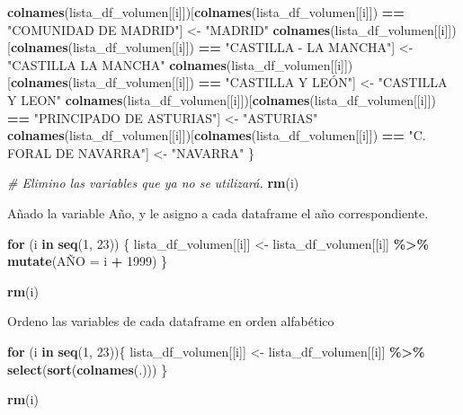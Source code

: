 \documentclass[
]{article}
\newenvironment{Shaded}{\begin{snugshade}}{\end{snugshade}}
\newcommand{\CommentTok}[1]{\textcolor[rgb]{0.56,0.35,0.01}{\textit{#1}}}
\newcommand{\ControlFlowTok}[1]{\textcolor[rgb]{0.13,0.29,0.53}{\textbf{#1}}}
\newcommand{\DecValTok}[1]{\textcolor[rgb]{0.00,0.00,0.81}{#1}}
\newcommand{\FunctionTok}[1]{\textcolor[rgb]{0.13,0.29,0.53}{\textbf{#1}}}
\newcommand{\NormalTok}[1]{#1}
\newcommand{\OtherTok}[1]{\textcolor[rgb]{0.56,0.35,0.01}{#1}}
\newcommand{\SpecialCharTok}[1]{\textcolor[rgb]{0.81,0.36,0.00}{\textbf{#1}}}
\newcommand{\StringTok}[1]{\textcolor[rgb]{0.31,0.60,0.02}{#1}}
\begin{document}
\begin{Shaded}
\begin{Highlighting}[]
  \FunctionTok{colnames}\NormalTok{(lista\_df\_volumen[[i]])[}\FunctionTok{colnames}\NormalTok{(lista\_df\_volumen[[i]]) }\SpecialCharTok{==} \StringTok{"COMUNIDAD DE MADRID"}\NormalTok{] }\OtherTok{\textless{}{-}} \StringTok{"MADRID"}
  \FunctionTok{colnames}\NormalTok{(lista\_df\_volumen[[i]])[}\FunctionTok{colnames}\NormalTok{(lista\_df\_volumen[[i]]) }\SpecialCharTok{==} \StringTok{"CASTILLA {-} LA MANCHA"}\NormalTok{] }\OtherTok{\textless{}{-}} \StringTok{"CASTILLA LA MANCHA"}
  \FunctionTok{colnames}\NormalTok{(lista\_df\_volumen[[i]])[}\FunctionTok{colnames}\NormalTok{(lista\_df\_volumen[[i]]) }\SpecialCharTok{==} \StringTok{"CASTILLA Y LEÓN"}\NormalTok{] }\OtherTok{\textless{}{-}} \StringTok{"CASTILLA Y LEON"}
  \FunctionTok{colnames}\NormalTok{(lista\_df\_volumen[[i]])[}\FunctionTok{colnames}\NormalTok{(lista\_df\_volumen[[i]]) }\SpecialCharTok{==} \StringTok{"PRINCIPADO DE ASTURIAS"}\NormalTok{] }\OtherTok{\textless{}{-}} \StringTok{"ASTURIAS"}
  \FunctionTok{colnames}\NormalTok{(lista\_df\_volumen[[i]])[}\FunctionTok{colnames}\NormalTok{(lista\_df\_volumen[[i]]) }\SpecialCharTok{==} \StringTok{"C. FORAL DE NAVARRA"}\NormalTok{] }\OtherTok{\textless{}{-}} \StringTok{"NAVARRA"}
\NormalTok{\}}

\CommentTok{\# Elimino las variables que ya no se utilizará.}
\FunctionTok{rm}\NormalTok{(i)}
\end{Highlighting}
\end{Shaded}

Añado la variable Año, y le asigno a cada dataframe el año
correspondiente.

\begin{Shaded}
\begin{Highlighting}[]
\ControlFlowTok{for}\NormalTok{ (i }\ControlFlowTok{in} \FunctionTok{seq}\NormalTok{(}\DecValTok{1}\NormalTok{, }\DecValTok{23}\NormalTok{)) \{}
\NormalTok{  lista\_df\_volumen[[i]] }\OtherTok{\textless{}{-}}\NormalTok{ lista\_df\_volumen[[i]] }\SpecialCharTok{\%\textgreater{}\%}
    \FunctionTok{mutate}\NormalTok{(AÑO }\OtherTok{=}\NormalTok{ i }\SpecialCharTok{+} \DecValTok{1999}\NormalTok{)}
\NormalTok{\}}

\FunctionTok{rm}\NormalTok{(i)}
\end{Highlighting}
\end{Shaded}

Ordeno las variables de cada dataframe en orden alfabético

\begin{Shaded}
\begin{Highlighting}[]
\ControlFlowTok{for}\NormalTok{ (i }\ControlFlowTok{in} \FunctionTok{seq}\NormalTok{(}\DecValTok{1}\NormalTok{, }\DecValTok{23}\NormalTok{))\{}
\NormalTok{  lista\_df\_volumen[[i]] }\OtherTok{\textless{}{-}}\NormalTok{ lista\_df\_volumen[[i]] }\SpecialCharTok{\%\textgreater{}\%}
    \FunctionTok{select}\NormalTok{(}\FunctionTok{sort}\NormalTok{(}\FunctionTok{colnames}\NormalTok{(.)))}
\NormalTok{\}}

\FunctionTok{rm}\NormalTok{(i)}
\end{Highlighting}
\end{Shaded}
\end{document}
